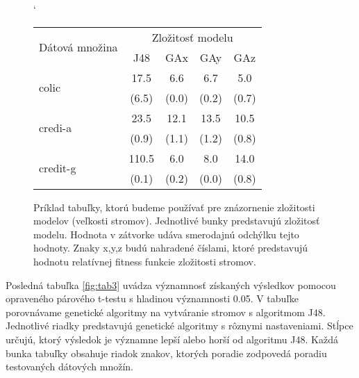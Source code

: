 \begin{figure}[h]
\catcode`
\centering 
\newcommand\T{\rule{0pt}{2.6ex}}       %
\newcommand\B{\rule[-1.2ex]{0pt}{0pt}} %
\begin{tabular}{|l||c|c|c|c||}
\hline \multirow{2}{*}{Dátová množina} & \multicolumn{4}{|c||}{Zložitosť modelu} \\ 
\cline{2-5} & J48 & GAx & GAy & GAz \\
\hline
\hline \multirow{2}{*}{colic} & 17.5 & 6.6 & 6.7 & 5.0 \T\\[-1.5ex]
& \tiny (6.5) & \tiny (0.0) & \tiny (0.2) & \tiny (0.7)\B\\
\hline \multirow{2}{*}{credi-a} & 23.5 & 12.1 & 13.5 & 10.5 \T\\[-1.5ex]
& \tiny (0.9) & \tiny (1.1) & \tiny (1.2) & \tiny (0.8)\B\\
\hline \multirow{2}{*}{credit-g} & 110.5 & 6.0 & 8.0 & 14.0 \T\\[-1.5ex]
& \tiny (0.1) & \tiny (0.2) & \tiny (0.0) & \tiny (0.8)\B\\
\hline
\end{tabular}
\caption{Príklad tabuľky, ktorú budeme používať pre znázornenie zložitosti modelov (veľkosti stromov). Jednotlivé bunky predstavujú zložitosť modelu. Hodnota v zátvorke udáva smerodajnú odchýlku tejto hodnoty. Znaky x,y,z budú nahradené číslami, ktoré predstavujú hodnotu relatívnej fitness funkcie zložitosti stromov.}\label{fig:tab2}
\end{figure}

Posledná tabuľka \ref{fig:tab3} uvádza významnosť získaných výsledkov pomocou opraveného párového t-testu s hladinou významnosti 0.05. V tabuľke porovnávame genetické algoritmy na vytváranie stromov s algoritmom J48. Jednotlivé riadky predstavujú genetické algoritmy s rôznymi nastaveniami. Stĺpce určujú, ktorý výsledok je významne lepší alebo horší od algoritmu J48. Každá bunka tabuľky obsahuje riadok znakov, ktorých poradie zodpovedá poradiu testovaných dátových množín.

